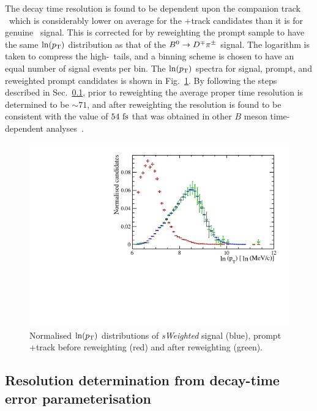 The decay time resolution is found to be dependent upon the companion track \pt~which is considerably lower on average for the \Dpm+track candidates than it is for genuine \Bz\to\Dpm\pimp~signal. This is corrected for by reweighting the prompt sample to have the same $\ln(\mbox{$p_{\rm T}$})$ distribution as that of the $B^0\rightarrow D^\mp\pi^\pm$ signal. The logarithm is taken to compress the high-\pt~tails, and a binning scheme is chosen to have an equal number of signal events per bin. The $\ln(\mbox{$p_{\rm T}$})$ spectra for signal, prompt, and reweighted prompt candidates is shown in Fig.~\ref{fig:reweights}. By following the steps described in Sec.~\ref{sec:resolution}, prior to reweighting the average proper time resolution is determined to be $\sim71$\fs, and after reweighting the resolution is found to be consistent with the value of $54~\rm fs$ that was obtained in other $B$ meson time-dependent analyses~\cite{LHCB-PAPER-2014-051}.  
\begin{figure}[t]
	\begin{center}
		\includegraphics[width=0.60\linewidth]{05DecaytimeFit/figs/resolution/reweighting.pdf}
	\end{center}
        \vspace{-2mm}
			      \caption{Normalised $\ln(\mbox{$p_{\rm T}$})$ distributions of \emph{sWeighted} \Bz\to\Dpm\pimp signal (blue), prompt \Dpm+track before reweighting (red) and after reweighting (green).
				  \label{fig:reweights}}
\end{figure}

\subsection{Resolution determination from decay-time error parameterisation}
\label{sec:resolution}

